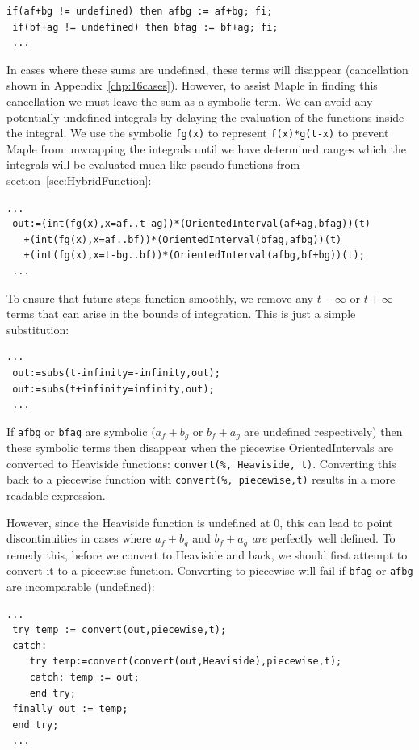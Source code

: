 \begin{lstlisting}[frame=single]
 if(af+bg != undefined) then afbg := af+bg; fi;
 if(bf+ag != undefined) then bfag := bf+ag; fi;
 ...
\end{lstlisting}


In cases where these sums are undefined, these terms will disappear (cancellation shown in Appendix~\ref{chp:16cases}).
However, to assist Maple in finding this cancellation we must leave the sum as a symbolic term.
We can avoid any potentially undefined integrals by delaying the evaluation of the functions inside the integral.
We use the symbolic \texttt{fg(x)} to represent \texttt{f(x)*g(t-x)} to prevent Maple from unwrapping the integrals
until we have determined ranges which the integrals will be evaluated much like pseudo-functions from
 section~\ref{sec:HybridFunction}:


\begin{lstlisting}[frame=single]
 ...
 out:=(int(fg(x),x=af..t-ag))*(OrientedInterval(af+ag,bfag))(t)
   +(int(fg(x),x=af..bf))*(OrientedInterval(bfag,afbg))(t)
   +(int(fg(x),x=t-bg..bf))*(OrientedInterval(afbg,bf+bg))(t);
 ...
\end{lstlisting}


To ensure that future steps function smoothly, we remove any $t-\infty$ or $t+\infty$ terms that can arise in the 
bounds of integration.
This is just a simple substitution:


\begin{lstlisting}[frame=single]
  ...
 out:=subs(t-infinity=-infinity,out);
 out:=subs(t+infinity=infinity,out);
 ...
\end{lstlisting}

If \texttt{afbg} or \texttt{bfag} are symbolic ($a_f+b_g$ or $b_f+a_g$ are undefined respectively) then
these symbolic terms then disappear when the piecewise OrientedIntervals are converted to Heaviside functions:
 \texttt{convert(\%, Heaviside, t)}.
Converting this back to a piecewise function with \texttt{convert(\%, piecewise,t)} results in a more readable expression.


However, since the Heaviside function is undefined at 0, this can lead to point discontinuities in cases where $a_f+b_g$ and
 $b_f+a_g$ \emph{are} perfectly well defined.
To remedy this, before we convert to Heaviside and back, we should first attempt to convert it to a piecewise function.
Converting to piecewise will fail if \texttt{bfag} or \texttt{afbg} are incomparable (undefined):


\begin{lstlisting}[frame=single]
 ...
 try temp := convert(out,piecewise,t);
 catch: 
    try temp:=convert(convert(out,Heaviside),piecewise,t);
    catch: temp := out;
    end try;  
 finally out := temp; 
 end try;
 ...
\end{lstlisting}


